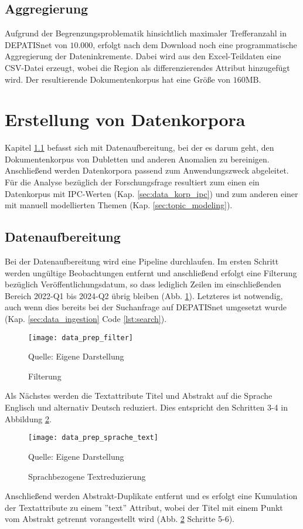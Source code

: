 \subsection{Aggregierung}

Aufgrund der Begrenzungsproblematik hinsichtlich maximaler Trefferanzahl in DEPATISnet von $10.000$, erfolgt nach dem Download noch eine programmatische Aggregierung der Dateninkremente. Dabei wird aus den Excel-Teildaten eine CSV-Datei erzeugt, wobei die Region als differenzierendes Attribut hinzugefügt wird. Der resultierende Dokumentenkorpus hat eine Größe von $160\text{MB}$.

\newpage
\section{Erstellung von Datenkorpora}
Kapitel \ref{sec:data_prep} befasst sich mit Datenaufbereitung, bei der es darum geht, den Dokumentenkorpus von Dubletten und anderen Anomalien zu bereinigen. Anschließend werden Datenkorpora passend zum Anwendungszweck abgeleitet. Für die Analyse bezüglich der Forschungsfrage resultiert zum einen ein Datenkorpus mit IPC-Werten (Kap. \ref{sec:data_korp_ipc}) und zum anderen einer mit manuell modellierten Themen (Kap. \ref{sec:topic_modeling}).


\subsection{Datenaufbereitung}\label{sec:data_prep}

Bei der Datenaufbereitung wird eine Pipeline durchlaufen. Im ersten Schritt werden ungültige Beobachtungen entfernt und anschließend erfolgt eine Filterung bezüglich Veröffentlichungsdatum, so dass lediglich Zeilen im einschließenden Bereich 2022-Q1 bis 2024-Q2 übrig bleiben (Abb. \ref{fig:data_prep_filter}). Letzteres ist notwendig, auch wenn dies bereits bei der Suchanfrage auf \ac{DEPATIS}net umgesetzt wurde (Kap. \ref{sec:data_ingestion} Code \ref{lst:search}). 
\begin{figure}[H]
	\caption{Filterung}
	\texttt{[image: data\_prep\_filter]}
	\label{fig:data_prep_filter}
	\raggedright
	\normalsize{Quelle: Eigene Darstellung}
	\vspace{-1.0em}
\end{figure}
Als Nächstes werden die Textattribute Titel und Abstrakt auf die Sprache Englisch und alternativ Deutsch reduziert. Dies entspricht den Schritten 3-4 in Abbildung \ref{fig:data_prep_sprache_text}.
\begin{figure}[H]
	\centering
	\texttt{[image: data\_prep\_sprache\_text]}
	\caption{Sprachbezogene Textreduzierung}
	\label{fig:data_prep_sprache_text}
	\vspace{0.5em}
	\raggedright
	\normalsize{Quelle: Eigene Darstellung}
	\vspace{-1.0em}
\end{figure}
Anschließend werden Abstrakt-Duplikate entfernt und es erfolgt eine Kumulation der Textattribute zu einem ''text'' Attribut, wobei der Titel mit einem Punkt vom Abstrakt getrennt vorangestellt wird (Abb. \ref{fig:data_prep_sprache_text} Schritte 5-6).

